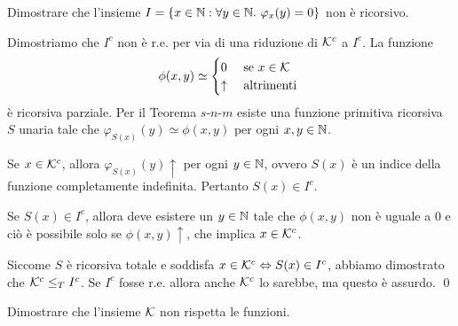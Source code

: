 \documentclass[runningheads,a4paper]{llncs}
\begin{document}
% 
% 
% 

\begin{exercise}
Dimostrare che l'insieme $I = \{x \in \mathbb{N} : \forall y \in\mathbb{N}.\ \varphi_x(y) = 0\}$ non \`{e} ricorsivo.
\end{exercise}

\begin{solution}
 Dimostriamo che $I^c$ non \`{e} r.e. per via di una riduzione di $\mathcal{K}^c$ a $I^c$. La funzione
$$
\phi(x,y) \simeq
\begin{cases}
0            & \mbox{ se $x \in \mathcal{K}$} \\
\uparrow     & \mbox{ altrimenti } \\
\end{cases}
$$
\`{e} ricorsiva parziale. Per il Teorema $s$-$n$-$m$ esiste una funzione primitiva ricorsiva $S$ unaria tale che $\varphi_{S(x)}(y) \simeq \phi(x,y)$ per ogni $x,y \in \mathbb{N}$.
 
Se $x\in\mathcal{K}^c$, allora $\varphi_{S(x)}(y)\uparrow$ per ogni $y \in\mathbb{N}$, ovvero $S(x)$ \`{e} un indice della funzione completamente indefinita.
 Pertanto $S(x) \in I^c$.

Se $S(x)\in I^c$, allora deve esistere un $y \in \mathbb{N}$ tale che $\phi(x,y)$ non \`{e} uguale a $0$ e ci\`{o} \`{e} possibile solo se
 $\phi(x,y)\uparrow$, che implica $x\in\mathcal{K}^c$.

Siccome $S$ \`{e} ricorsiva totale e soddisfa $x \in\mathcal{K}^c \Leftrightarrow S(x)\in I^c$, abbiamo dimostrato che $\mathcal{K}^c \leq_T I^c$. Se $I^c$ fosse
 r.e. allora anche $\mathcal{K}^c$ lo sarebbe, ma questo \`{e} assurdo.
\qed\end{solution}

\begin{exercise}
Dimostrare che l'insieme $\mathcal{K}$ non rispetta le funzioni.
\end{exercise}
\end{document}
